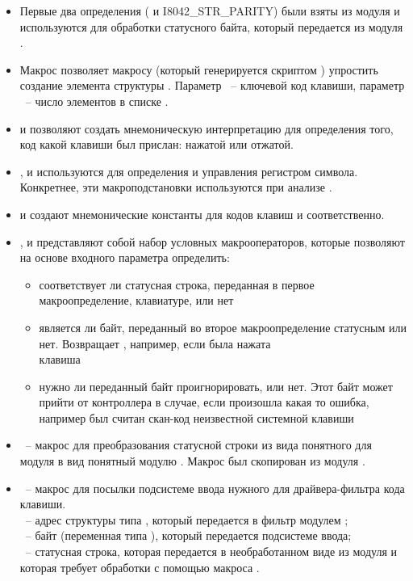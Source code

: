 \begin{itemize}
	\item Первые два определения ( и {I8042\_STR\_PARITY}) были взяты из модуля
		  и используются для обработки статусного байта, который передается
		из модуля .
	\item Макрос  позволяет макросу  (который генерируется скриптом ) упростить 
		создание элемента структуры . Параметр ~-- ключевой код клавиши, параметр ~--
		число элементов в списке .
	\item {} и  позволяют создать мнемоническую интерпретацию для определения того, код какой
		клавиши был прислан: нажатой или отжатой.
	\item {},  и  используются для определения и управления регистром символа. Конкретнее,
		эти макроподстановки используются при анализе .
	\item {} и  создают мнемонические константы для кодов клавиш  и 
		 соответственно.
	\item {},  и  представляют собой
		набор условных макрооператоров, которые позволяют на основе входного параметра определить:
		\begin{itemize}
			\item соответствует ли статусная строка, переданная в первое макроопределение, клавиатуре, или нет
			\item является ли байт, переданный во второе макроопределение статусным или нет. Возвращает
				, например, если была нажата\\клавиша 
			\item нужно ли переданный байт проигнорировать, или нет. Этот байт может прийти от контроллера
				в случае, если произошла какая то ошибка, например был считан скан-код неизвестной системной клавиши
		\end{itemize}
	\item {}~-- макрос для преобразования статусной строки из вида понятного для модуля  в
		вид понятный модулю . Макрос был скопирован из модуля .
	\item {}~-- макрос для посылки подсистеме ввода нужного для драйвера-фильтра кода клавиши.\\
		~-- адрес структуры типа , который передается в фильтр модулем ;\\
		~-- байт (переменная типа ), который передается подсистеме ввода;\\
		~-- статусная строка, которая передается в необработанном виде из модуля  и которая
			требует обработки с помощью макроса .
\end{itemize}

